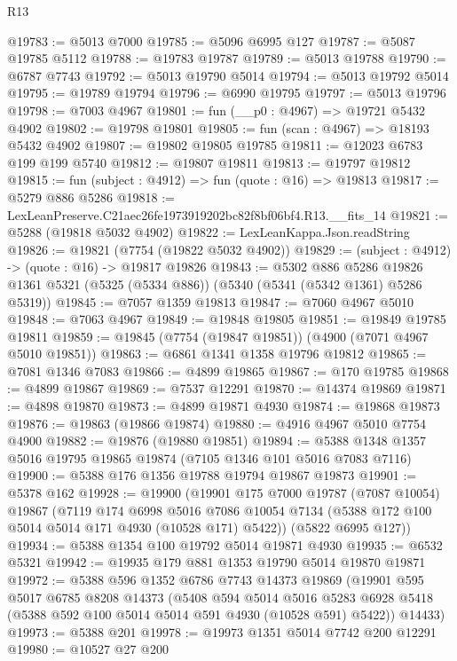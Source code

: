 \begin{lexlean}{R13}
\begin{coremodule}
@19783 := @5013 @7000
@19785 := @5096 @6995 @127
@19787 := @5087 @19785 @5112
@19788 := @19783 @19787
@19789 := @5013 @19788
@19790 := @6787 @7743
@19792 := @5013 @19790 @5014
@19794 := @5013 @19792 @5014
@19795 := @19789 @19794
@19796 := @6990 @19795
@19797 := @5013 @19796
@19798 := @7003 @4967
@19801 := fun (__p0 : @4967) => @19721 @5432 @4902
@19802 := @19798 @19801
@19805 := fun (scan : @4967) => @18193 @5432 @4902
@19807 := @19802 @19805 @19785
@19811 := @12023 @6783 @199 @199 @5740
@19812 := @19807 @19811
@19813 := @19797 @19812
@19815 := fun (subject : @4912) => fun (quote : @16) => @19813
@19817 := @5279 @886 @5286
@19818 := LexLeanPreserve.C21aec26fe1973919202bc82f8bf06bf4.R13.__fits_14
@19821 := @5288 (@19818 @5032 @4902)
@19822 := LexLeanKappa.Json.readString
@19826 := @19821 (@7754 (@19822 @5032 @4902))
@19829 := (subject : @4912) -> (quote : @16) -> @19817 @19826
@19843 := @5302
    @886
    @5286
    @19826
    @1361
    @5321
    (@5325 (@5334 @886))
    (@5340 (@5341 (@5342 @1361) @5286 @5319))
@19845 := @7057 @1359 @19813
@19847 := @7060 @4967 @5010
@19848 := @7063 @4967
@19849 := @19848 @19805
@19851 := @19849 @19785 @19811
@19859 := @19845 (@7754 (@19847 @19851)) (@4900 (@7071 @4967 @5010 @19851))
@19863 := @6861 @1341 @1358 @19796 @19812
@19865 := @7081 @1346 @7083
@19866 := @4899 @19865
@19867 := @170 @19785
@19868 := @4899 @19867
@19869 := @7537 @12291
@19870 := @14374 @19869
@19871 := @4898 @19870
@19873 := @4899 @19871 @4930
@19874 := @19868 @19873
@19876 := @19863 (@19866 @19874)
@19880 := @4916 @4967 @5010 @7754 @4900
@19882 := @19876 (@19880 @19851)
@19894 := @5388 @1348 @1357 @5016 @19795 @19865 @19874 (@7105 @1346 @101 @5016 @7083 @7116)
@19900 := @5388 @176 @1356 @19788 @19794 @19867 @19873
@19901 := @5378 @162
@19928 := @19900
    (@19901
      @175
      @7000
      @19787
      (@7087 @10054)
      @19867
      (@7119
        @174
        @6998
        @5016
        @7086
        @10054
        @7134
        (@5388 @172 @100 @5014 @5014 @171 @4930 (@10528 @171) @5422))
      (@5822 @6995 @127))
@19934 := @5388 @1354 @100 @19792 @5014 @19871 @4930
@19935 := @6532 @5321
@19942 := @19935 @179 @881 @1353 @19790 @5014 @19870 @19871
@19972 := @5388
    @596
    @1352
    @6786
    @7743
    @14373
    @19869
    (@19901
      @595
      @5017
      @6785
      @8208
      @14373
      (@5408
        @594
        @5014
        @5016
        @5283
        @6928
        @5418
        (@5388 @592 @100 @5014 @5014 @591 @4930 (@10528 @591) @5422))
      @14433)
@19973 := @5388 @201
@19978 := @19973 @1351 @5014 @7742 @200 @12291
@19980 := @10527 @27 @200

\end{coremodule}
\end{lexlean}
